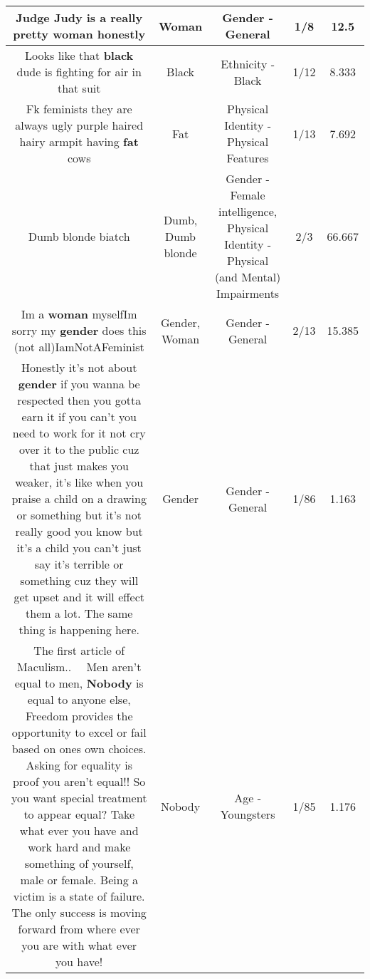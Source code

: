 \documentclass[11pt]{article}
\newlength\mylength
\begin{document}
\begin{center}
\begin{longtable}{|C{.65\mylength}|C{.30\mylength}|C{.12\mylength}|C{.12\mylength}|C{.12\mylength}|}
  \small Judge Judy is a really pretty \textbf{woman} honestly\normalsize   & Woman & Gender - General & 1/8 & 12.5 \\  \hline
  \small Looks like that \textbf{black} dude is fighting for air in that suit\normalsize   & Black & Ethnicity - Black & 1/12 & 8.333 \\  \hline
  \small Fk feminists they are always ugly purple haired hairy armpit having \textbf{fat} cows\normalsize   & Fat & Physical Identity - Physical Features & 1/13 & 7.692 \\  \hline
  \small Dumb blonde biatch\normalsize   & Dumb, Dumb blonde & Gender - Female intelligence, Physical Identity - Physical (and Mental) Impairments & 2/3 & 66.667 \\  \hline
  \small Im a \textbf{woman} myselfIm sorry my \textbf{gender} does this (not all)IamNotAFeminist\normalsize   & Gender, Woman & Gender - General & 2/13 & 15.385 \\  \hline
  \small Honestly it's not about \textbf{gender} if you wanna be respected then you gotta earn it if you can't you need to work for it not cry over it to the public cuz that just makes you weaker, it's like when you praise a child on a drawing or something but it's not really good you know but it's a child you can't just say it's terrible or something cuz they will get upset and it will effect them a lot. The same thing is happening here.\normalsize   & Gender & Gender - General & 1/86 & 1.163 \\  \hline
  \small The first article of Maculism..   Men aren't equal to men, \textbf{Nobody} is equal to anyone else, Freedom provides the opportunity to excel or fail based on ones own choices. Asking for equality is proof you aren't equal!! So you want special treatment to appear equal? Take what ever you have and work hard and make something of yourself, male or female. Being a victim is a state of failure. The only success is moving forward from where ever you are with what ever you have!\normalsize   & Nobody & Age - Youngsters & 1/85 & 1.176 \\  \hline

\end{longtable}
\end{center}
\end{document}
